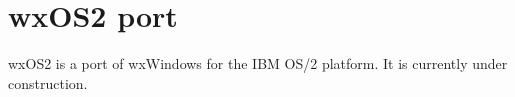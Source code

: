 \section{wxOS2 port}\label{wxos2port}

wxOS2 is a port of wxWindows for the IBM OS/2 platform.
It is currently under construction.

